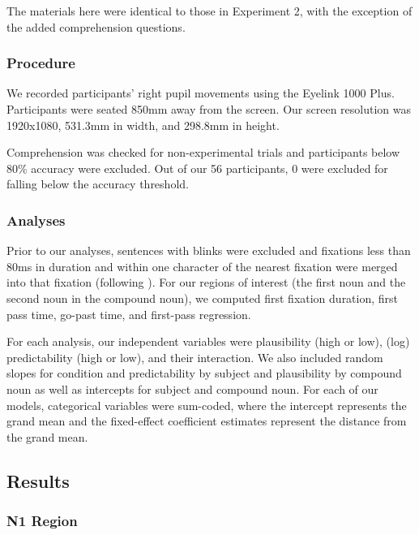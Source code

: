 \documentclass[
  12pt,
  letterpaper,
]{scrreport}
\begin{document}
The materials here were identical to those in Experiment 2, with the
exception of the added comprehension questions.

\subsubsection{Procedure}\label{procedure-2}

We recorded participants' right pupil movements using the Eyelink 1000
Plus. Participants were seated 850mm away from the screen. Our screen
resolution was 1920x1080, 531.3mm in width, and 298.8mm in height.

Comprehension was checked for non-experimental trials and participants
below 80\% accuracy were excluded. Out of our 56 participants, 0 were
excluded for falling below the accuracy threshold.

\subsubsection{Analyses}\label{analyses-1}

Prior to our analyses, sentences with blinks were excluded and fixations
less than 80ms in duration and within one character of the nearest
fixation were merged into that fixation (following
). For
our regions of interest (the first noun and the second noun in the
compound noun), we computed first fixation duration, first pass time,
go-past time, and first-pass regression.

For each analysis, our independent variables were plausibility (high or
low), (log) predictability (high or low), and their interaction. We also
included random slopes for condition and predictability by subject and
plausibility by compound noun as well as intercepts for subject and
compound noun. For each of our models, categorical variables were
sum-coded, where the intercept represents the grand mean and the
fixed-effect coefficient estimates represent the distance from the grand
mean.

\subsection{Results}\label{results-3}

\subsubsection{N1 Region}\label{n1-region-1}
\end{document}
